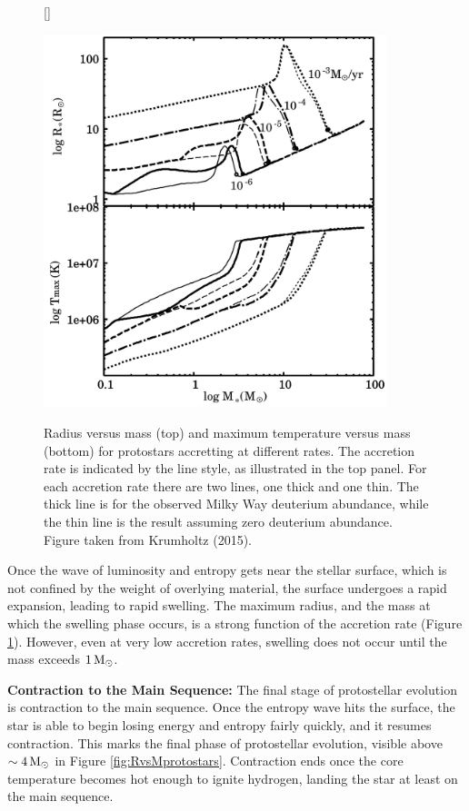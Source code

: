 \documentclass[a4paper,10pt]{article}
\begin{document}
\begin{figure}[t]
    [\FBwidth]
    {\caption{\footnotesize{Radius versus mass (top) and maximum temperature versus mass (bottom) for protostars accretting at different rates. The accretion rate is indicated by the line style, as illustrated in the top panel. For each accretion rate there are two lines, one thick and one thin. The thick line is for the observed Milky Way deuterium abundance, while the thin line is the result assuming zero deuterium abundance. Figure taken from Krumholtz (2015).}}
    \label{fig:swelling}}
    {\includegraphics[width=10cm]{figures/swelling.png}}
\end{figure}

{\noindent}Once the wave of luminosity and entropy gets near the stellar surface, which is not confined by the weight of overlying material, the surface undergoes a rapid expansion, leading to rapid swelling. The maximum radius, and the mass at which the swelling phase occurs, is a strong function of the accretion rate (Figure \ref{fig:swelling}). However, even at very low accretion rates, swelling does not occur until the mass exceeds $1\,{\rm M_\odot}$.

{\noindent}\textbf{Contraction to the Main Sequence:} The final stage of protostellar evolution is contraction to the main sequence. Once the entropy wave hits the surface, the star is able to begin losing energy and entropy fairly quickly, and it resumes contraction. This marks the final phase of protostellar evolution, visible above $\sim4\,{\rm M_\odot}$ in Figure \ref{fig:RvsMprotostars}. Contraction ends once the core temperature becomes hot enough to ignite hydrogen, landing the star at least on the main sequence.
\end{document}
